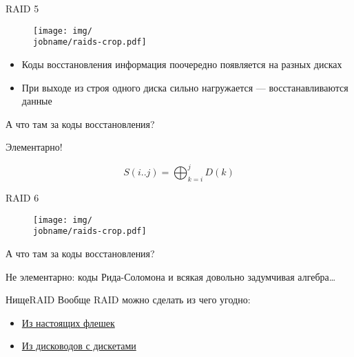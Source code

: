 \documentclass[xetex,aspectratio=43]{beamer}
\begin{document}
\begin{frame}{RAID 5}
    \begin{figure}
        \texttt{[image: img/\\jobname/raids-crop.pdf]}
    \end{figure}

\begin{itemize}
\tightlist
\item
  Коды восстановления информация поочередно появляется на разных дисках
\item
  При выходе из строя одного диска сильно нагружается ---
  восстанавливаются данные
\end{itemize}

А что там за коды восстановления?

\pause

Элементарно!

\[S(i..j) = \displaystyle\bigoplus_{k=i}^jD(k)\]
\end{frame}

\begin{frame}{RAID 6}
    \begin{figure}
        \texttt{[image: img/\\jobname/raids-crop.pdf]}
    \end{figure}

А что там за коды восстановления?

\pause

Не элементарно: коды Рида-Соломона и всякая довольно задумчивая алгебра\ldots
\end{frame}

\begin{frame}{НищеRAID}
    Вообще RAID можно сделать из чего угодно:
    \begin{itemize}
    \item \href{https://youtu.be/dougISKs2vQ}{Из настоящих флешек}
    \item \href{https://youtu.be/Uxj7So3h-lw}{Из дисководов с дискетами}
    \end{itemize}
\end{frame}
\end{document}
